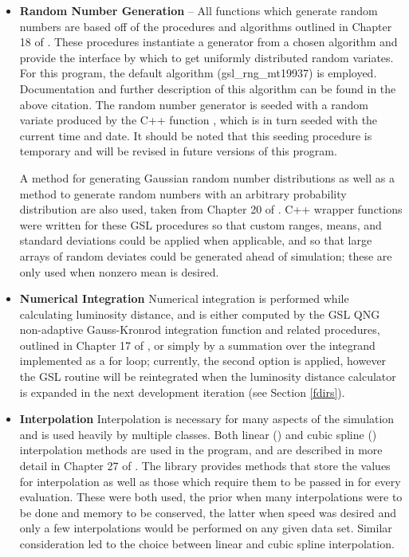\documentclass[twocolumn,letterpaper,10pt]{article}
\begin{document}
\begin{itemize}

\item \textbf{Random Number Generation} --
All functions which generate random numbers are based off of the procedures and algorithms outlined in Chapter 18 of \citet{GSL}. These procedures instantiate a generator from a chosen algorithm and provide the interface by which to get uniformly distributed random variates. For this program, the default algorithm ({\sc gsl\_rng\_mt19937}) is employed. Documentation and further description of this algorithm can be found in the above citation. The random number generator is seeded with a random variate produced by the C++ function {}, which is in turn seeded with the current time and date. It should be noted that this seeding procedure is temporary and will be revised in future versions of this program. 

A method for generating Gaussian random number distributions as well as a method to generate random numbers with an arbitrary probability distribution are also used, taken from Chapter 20 of \citet{GSL}.  C++ wrapper functions were written for these GSL procedures so that custom ranges, means, and standard deviations could be applied when applicable, and so that large arrays of random deviates could be generated ahead of simulation; these are only used when nonzero mean is desired.

\item \textbf{Numerical Integration}
Numerical integration is performed while calculating luminosity distance, and is either computed by the GSL QNG non-adaptive Gauss-Kronrod integration function and related procedures, outlined in Chapter 17 of \citet{GSL}, or simply by a summation over the integrand implemented as a for loop; currently, the second option is applied, however the GSL routine will be reintegrated when the luminosity distance calculator is expanded in the next development iteration (see Section \ref{fdirs}).

\item \textbf{Interpolation}
Interpolation is necessary for many aspects of the simulation and is used heavily by multiple classes. Both linear ({}) and cubic spline ({}) interpolation methods are used in the program, and are described in more detail in Chapter 27 of \citet{GSL}. The library provides methods that store the values for interpolation as well as those which require them to be passed in for every evaluation. These were both used, the prior when many interpolations were to be done and memory to be conserved, the latter when speed was desired and only a few interpolations would be performed on any given data set. Similar consideration led to the choice between linear and cubic spline interpolation.

\end{itemize}
\end{document}
